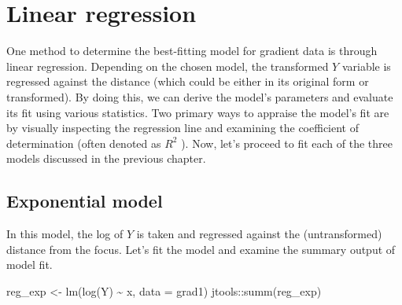 \documentclass[
  letterpaper,
]{book}
\newenvironment{Shaded}{\begin{snugshade}}{\end{snugshade}}
\newcommand{\AttributeTok}[1]{\textcolor[rgb]{0.40,0.45,0.13}{#1}}
\newcommand{\FunctionTok}[1]{\textcolor[rgb]{0.28,0.35,0.67}{#1}}
\newcommand{\NormalTok}[1]{\textcolor[rgb]{0.00,0.23,0.31}{#1}}
\newcommand{\OtherTok}[1]{\textcolor[rgb]{0.00,0.23,0.31}{#1}}
\newcommand{\SpecialCharTok}[1]{\textcolor[rgb]{0.37,0.37,0.37}{#1}}
\begin{document}
\hypertarget{linear-regression-1}{%
\section{Linear regression}\label{linear-regression-1}}

One method to determine the best-fitting model for gradient data is
through linear regression. Depending on the chosen model, the
transformed \(Y\) variable is regressed against the distance (which
could be either in its original form or transformed). By doing this, we
can derive the model's parameters and evaluate its fit using various
statistics. Two primary ways to appraise the model's fit are by visually
inspecting the regression line and examining the coefficient of
determination (often denoted as \(R^2\) ). Now, let's proceed to fit
each of the three models discussed in the previous chapter.

\hypertarget{exponential-model-1}{%
\subsection{Exponential model}\label{exponential-model-1}}

In this model, the log of \(Y\) is taken and regressed against the
(untransformed) distance from the focus. Let's fit the model and examine
the summary output of model fit.

\begin{Shaded}
\begin{Highlighting}[]
\NormalTok{reg\_exp }\OtherTok{\textless{}{-}} \FunctionTok{lm}\NormalTok{(}\FunctionTok{log}\NormalTok{(Y) }\SpecialCharTok{\textasciitilde{}}\NormalTok{ x, }\AttributeTok{data =}\NormalTok{ grad1)}
\NormalTok{jtools}\SpecialCharTok{::}\FunctionTok{summ}\NormalTok{(reg\_exp)}
\end{Highlighting}
\end{Shaded}
\end{document}
